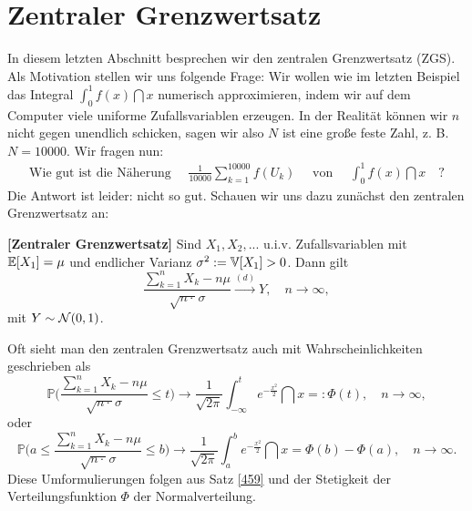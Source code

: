 \section{Zentraler Grenzwertsatz}\label{sec:ZGS}
In diesem letzten Abschnitt besprechen wir den zentralen Grenzwertsatz (ZGS). Als Motivation stellen wir uns folgende Frage: Wir wollen wie im letzten Beispiel das Integral $\int_0^1 f(x)\dint x$ numerisch approximieren, indem wir auf dem Computer viele uniforme Zufallsvariablen erzeugen. In der Realit\"at k\"onnen wir $n$ nicht gegen unendlich schicken, sagen wir also $N$ ist eine gro\ss e feste Zahl, z. B. $N=10000$. Wir fragen nun:
\begin{align*}
	\text{Wie gut ist die N\"aherung $\quad \frac{1}{10000} \sum_{k=1}^{10000} f(U_k)\quad$ von $\quad\int_0^1 f(x)\dint x\quad$?} 
\end{align*}	
	Die Antwort ist leider: nicht so gut.  Schauen wir uns dazu zun\"achst den zentralen Grenzwertsatz an:
\begin{satz}\label{ZGS}
 \textbf{[Zentraler Grenzwertsatz]}
	Sind $X_1,X_2,...$ u.i.v. Zufallsvariablen mit $\mathbb{E}[X_1] = \mu$ und endlicher Varianz $\sigma^2:=\mathbb{V}[X_1]  > 0$. Dann gilt
		\label{ZGSEins} \[ \frac{\sum_{k = 1}^{n} X_k - n \mu}{\sqrt{n \cdot }\sigma} \overset{(d)}{\longrightarrow} Y, \quad n \to \infty, \]
		mit $Y \sim \mathcal{N}(0,1)$.
\end{satz}
Oft sieht man den zentralen Grenzwertsatz auch mit Wahrscheinlichkeiten geschrieben als
	 	 \[ \mathbb{P}\Big( \frac{\sum_{k=1}^{n}X_k - n \mu}{\sqrt{n \cdot }\sigma} \leq t\Big) \to \frac{1}{\sqrt{2 \pi}} \int_{-\infty}^{t} e^{-\frac{x^2}{2}} \dint x=: \Phi(t) ,\quad  n \to \infty,\]
oder
	 \[ \mathbb{P}\Big( a \leq \frac{\sum_{k=1}^{n}X_k - n \mu}{\sqrt{n \cdot }\sigma} \leq b \Big) \to \frac{1}{\sqrt{2 \pi}} \int_{a}^{b} e^{-\frac{x^2}{2}} \dint x=\Phi(b)-\Phi(a),\quad  n \to \infty.\]
	Diese Umformulierungen folgen aus Satz \ref{459} und der Stetigkeit der Verteilungsfunktion $\Phi$ der Normalverteilung.

